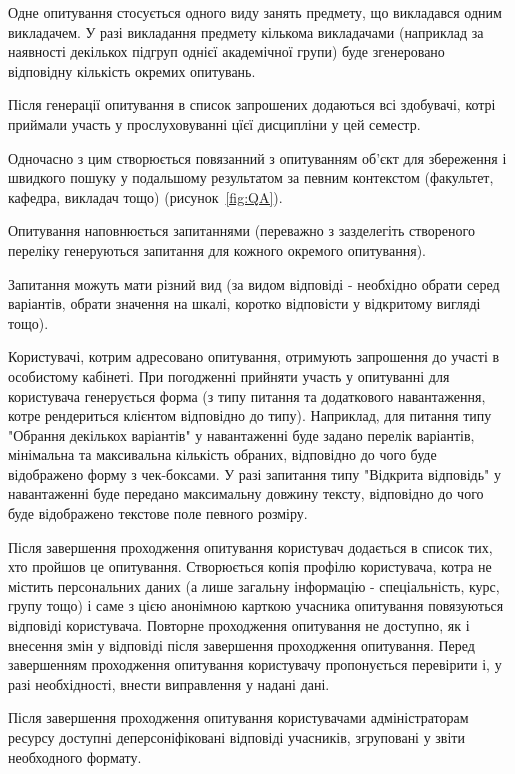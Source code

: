 Одне опитування стосується одного виду занять предмету, що викладався одним викладачем. У разі викладання предмету кількома викладачами (наприклад за наявності декількох підгруп однієї академічної групи) буде згенеровано відповідну кількість окремих опитувань.

Після генерації опитування в список запрошених додаються всі здобувачі, котрі приймали участь у прослуховуванні цїєї дисципліни у цей семестр.

Одночасно з цим створюється повязанний з опитуванням об'єкт для збереження і швидкого пошуку у подальшому результатом за певним контекстом (факультет, кафедра, викладач тощо) (рисунок~\ref{fig:QA}).







Опитування наповнюється запитаннями (переважно з зазделегіть створеного переліку генеруються запитання для кожного окремого опитування). 

Запитання можуть мати різний вид (за видом відповіді - необхідно обрати серед варіантів, обрати значення на шкалі, коротко відповісти у відкритому вигляді тощо).

Користувачі, котрим адресовано опитування, отримують запрошення до участі в особистому кабінеті. При погодженні прийняти участь у опитуванні для користувача генерується форма (з типу питання та додаткового навантаження, котре рендериться клієнтом відповідно до типу). Наприклад, для питання типу "Обрання декількох варіантів" у навантаженні буде задано перелік варіантів, мінімальна та максивальна кількість обраних, відповідно до чого буде відображено форму з чек-боксами. У разі запитання типу "Відкрита відповідь" у навантаженні буде передано максимальну довжину тексту, відповідно до чого буде відображено текстове поле певного розміру.

Після завершення проходження опитування користувач додається в список тих, хто пройшов це опитування. Створюється копія профілю користувача, котра не містить персональних даних (а лише загальну інформацію - спеціальність, курс, групу тощо) і саме з цією анонімною карткою учасника опитування повязуються відповіді користувача. Повторне проходження опитування не доступно, як і внесення змін у відповіді після завершення проходження опитування. Перед завершенням проходження опитування користувачу пропонується перевірити і, у разі необхідності, внести виправлення у надані дані.

Після завершення проходження опитування користувачами адміністраторам ресурсу доступні деперсоніфіковані відповіді учасників, згруповані у звіти необходного формату.
